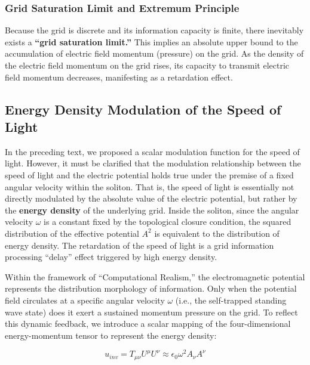\documentclass[12pt, a4paper]{article}
\begin{document}
\subsubsection{Grid Saturation Limit and Extremum Principle}

Because the grid is discrete and its information capacity is finite, there inevitably exists a \textbf{``grid saturation limit.''} This implies an absolute upper bound to the accumulation of electric field momentum (pressure) on the grid. As the density of the electric field momentum on the grid rises, its capacity to transmit electric field momentum decreases, manifesting as a retardation effect.

\subsection{Energy Density Modulation of the Speed of Light}

In the preceding text, we proposed a scalar modulation function for the speed of light. However, it must be clarified that the modulation relationship between the speed of light and the electric potential holds true under the premise of a fixed angular velocity within the soliton. That is, the speed of light is essentially not directly modulated by the absolute value of the electric potential, but rather by the \textbf{energy density} of the underlying grid. Inside the soliton, since the angular velocity $\omega$ is a constant fixed by the topological closure condition, the squared distribution of the effective potential $A^2$ is equivalent to the distribution of energy density. The retardation of the speed of light is a grid information processing ``delay'' effect triggered by high energy density.

Within the framework of ``Computational Realism,'' the electromagnetic potential represents the distribution morphology of information. Only when the potential field circulates at a specific angular velocity $\omega$ (i.e., the self-trapped standing wave state) does it exert a sustained momentum pressure on the grid. To reflect this dynamic feedback, we introduce a scalar mapping of the four-dimensional energy-momentum tensor to represent the energy density:

\begin{equation}
u_{inv} = T_{\mu\nu} U^\mu U^\nu \approx \epsilon_0 \omega^2 A_\nu A^\nu 
\end{equation}
\end{document}
